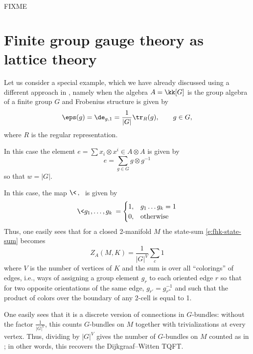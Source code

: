 FIXME


\section{Finite group gauge theory as lattice theory}\label{s:lattice-gauge}
Let us consider a special example, which we have already discussed using a
different approach in , namely when the algebra $A=\kk[G]$
is the group algebra of a finite group $G$ and Frobenius structure is given by
$$
  \eps(g)=\de_{g,1} = \frac{1}{|G|}\tr_R(g), \qquad g\in G,
$$
where $R$ is the regular representation.

In this case the element $e=\sum x_i\otimes x^i\in A\otimes A$ is given by
$$
  e=\sum_{g\in G}g\otimes g^{-1}
$$
so that $w=|G|$.

In this case, the map $\<\, , \,\>$ is given by
$$
  \<g_1, \dots, g_k\>=\begin{cases}
                 1, & g_1\dots g_k=1\\
               0, & \text{otherwise}
                   \end{cases}
$$
Thus, one easily sees that for a closed 2-manifold $M$
the state-sum \eqref{e:fhk-state-sum} becomes
$$
  Z_A(M,K)=\frac{1}{|G|^V} \sum_{c} 1
$$
where $V$ is the number of vertices of $K$ and  the sum is over all
``colorings'' of edges, i.e., ways of assigning a group element $g_r$ to each
oriented edge $r$ so that for two opposite orientations of the same edge,
$g_{r'}=g_{r''}^{-1}$ and such that the product of colors over the boundary of
any 2-cell is equal to 1.

One easily sees that it is a discrete version of connections in $G$-bundles:
without the factor $\frac{1}{|G|^V}$, this counts $G$-bundles on $M$ together
with trivializations at every vertex. Thus, dividing by $|G|^V$ gives
the number of $G$-bundles on $M$ counted as in ; in other words,
this recovers the Dijkgraaf--Witten TQFT.

